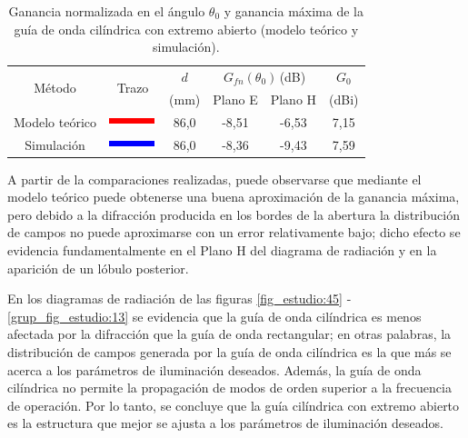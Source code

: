 \begin{table}[H]
\centering
\begin{tabular}{|c|c|c|c|c|c|}
\hline
\multirow{2}{*}{Método} & \multirow{2}{*}{Trazo} & $d$ & \multicolumn{2}{c|}{$G_{fn}\left(\theta_0\right)\,$(dB)} & $G_0$ \\
\cline{4-5}
& & (mm) & Plano E & Plano H & (dBi)\\
\hline
Modelo teórico & \includegraphics[scale = 1]{Figures/Estudio/linea_tabla_rojo} & 86,0 & -8,51 & -6,53 & 7,15 \\
\hline
Simulación & \includegraphics[scale = 1]{Figures/Estudio/linea_tabla_azul} & 86,0 & -8,36 & -9,43 & 7,59 \\
\hline
\end{tabular}
\caption{Ganancia normalizada en el ángulo $\theta_0$ y ganancia máxima de la guía de onda cilíndrica con extremo abierto (modelo teórico y simulación).}
\label{tabla_estudio:13}
\end{table}
A partir de la comparaciones realizadas, puede observarse que mediante el modelo teórico puede obtenerse una buena aproximación de la ganancia máxima, pero debido a la difracción producida en los bordes de la abertura la distribución de campos no puede aproximarse con un error relativamente bajo; dicho efecto se evidencia fundamentalmente en el Plano H del diagrama de radiación y en la aparición de un lóbulo posterior.

En los diagramas de radiación de las figuras \ref{fig_estudio:45} - \ref{grup_fig_estudio:13} se evidencia que la guía de onda cilíndrica es menos afectada por la difracción que la guía de onda rectangular; en otras palabras, la distribución de campos generada por la guía de onda cilíndrica es la que más se acerca a los parámetros de iluminación deseados. Además, la guía de onda cilíndrica no permite la propagación de modos de orden superior a la frecuencia de operación. Por lo tanto, se concluye que la guía cilíndrica con extremo abierto es la estructura que mejor se ajusta a los parámetros de iluminación deseados.

